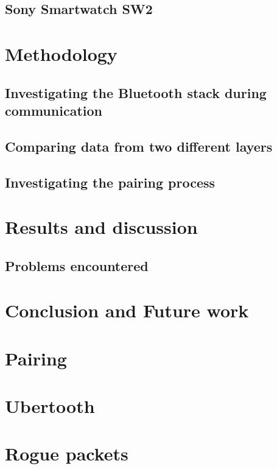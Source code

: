 \documentclass{article}
\begin{document}
	\subsection{Sony Smartwatch SW2} %
	
\newpage
\section{Methodology}		%
 
	\subsection{Investigating the Bluetooth stack during communication}
				
		
	\subsection{Comparing data from two different layers}	%
		
	
	\subsection{Investigating the pairing process}
		
\newpage
\section{Results and discussion}

		
		\newpage
		\subsection{Problems encountered}
		
\newpage
\section{Conclusion and Future work}


\newpage



{}


\appendix
\section{Pairing}
\label{app:pairing}
\section{Ubertooth}
\label{app:ubertooth}
\section{Rogue packets}
\label{app:roguepackets}

\end{document}
